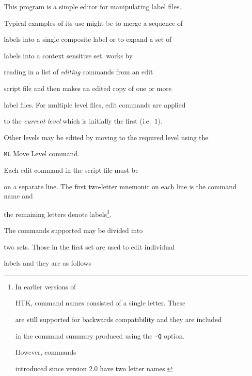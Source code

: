 This program is a simple editor for manipulating label files.


Typical examples of its use might be to merge a sequence of


labels into a single composite label or to expand a set of


labels into a context sensitive set.   works by


reading in a list of {\em editing} commands from an edit


script file and then makes an edited copy of one or more 


label files.  For multiple level files, edit commands are applied


to the \textit{current level} which is initially the first (i.e.\ 1).


Other levels may be edited by moving to the required level using the


\texttt{ML} Move Level command.





Each edit command in the script file must be


on a separate line.  The first two-letter mnemonic on each line is the command name and


the remaining letters denote labels\footnote{In earlier versions of 


HTK,  command names consisted of a single letter.  These


are still supported for backwards compatibility and they are included


in the command summary produced using the \texttt{-Q} option.  


However, commands


introduced since version 2.0  have two letter names.}.


The commands supported may be divided into


two sets.  Those in the first set are used to edit individual


labels and they are as follows





